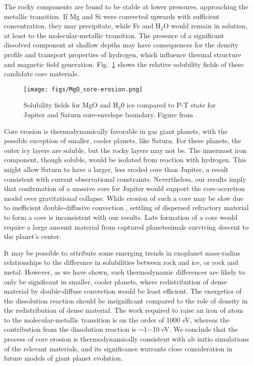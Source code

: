 The rocky components are found to be stable at lower pressures, approaching the
metallic transition. If Mg and Si were convected upwards with sufficient
concentration, they may precipitate, while Fe and $\mathrm{H}_2\mathrm{O}$
would remain in solution, at least to the molecular-metallic transition.  The
presence of a significant dissolved component at shallow depths may have
consequences for the density profile and transport properties of hydrogen,
which influence thermal structure and magnetic field generation.
Fig.~\ref{fig:mgoerosion} shows the relative solubility fields of these
candidate core materials.

 \begin{figure}[!h] %
   \centering
   \texttt{[image: figs/MgO\_core-erosion.png]} 
\caption{ Solubility fields for MgO and H$_2$0 ice compared to P-T state for Jupiter and Saturn
    core-envelope boundary. Figure from \citet{wilson12b}.\label{fig:mgoerosion}}
\end{figure}

Core erosion is thermodynamically favorable in gas giant planets,
with the possible exception of smaller, cooler planets, like Saturn. For these planets, the
outer icy layers are soluble, but the rocky layers may not be. The innermost
iron component, though soluble, would be isolated from reaction with hydrogen.
This might allow Saturn to have a larger, less eroded core than
Jupiter, a result consistent with current observational constraints.
Nevertheless, our results imply
that confirmation of a massive core for Jupiter would support the
core-accretion model over gravitational collapse. While erosion of such a core
may be slow due to inefficient double-diffusive convection
\citep{Stevenson1982a,Chabrier2007,Leconte2012,Mirouh2012}, settling of dispersed
refractory material to form a core is inconsistent with our results. Late formation of a core
would require a large amount material from captured planetesimals
surviving descent to the planet's center.

It may be possible to attribute some
emerging trends in exoplanet mass-radius relationships to the difference in
solubilities between rock and ice, or rock and metal. However, as we have
shown, such thermodynamic differences are likely to only be significant in
smaller, cooler planets, where redistribution of dense material by
double-diffuse convection would be least efficient. The energetics of the
dissolution reaction should be insignificant compared to the role of density
in the redistribution of dense material. The work required to raise an iron of atom to
the molecular-metallic transition is on the order of 1000 eV, whereas the
contribution from the dissolution reaction is $\sim$1$-$10 eV. We conclude
that the process of core erosion is thermodynamically consistent with ab
initio simulations of the relevant materials, and its
significance warrants close consideration in future models of giant planet
evolution.




